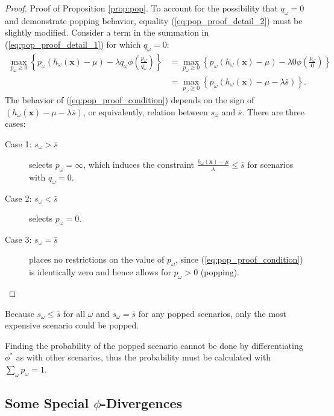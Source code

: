 \documentclass[opre,nonblindrev]{informs3} %
\newcommand{\x}{\mathbf{x}}
\begin{document}
\begin{proof}{\sc Proof of Proposition \ref{prop:pop}.}
	To account for the possibility that $q_\omega = 0$ and demonstrate popping behavior, equality (\ref{eq:pop_proof_detail_2}) must be slightly modified.
	Consider a term in the summation in (\ref{eq:pop_proof_detail_1}) for which $q_\omega = 0$:
	\begin{align}
		\max_{p_\omega \geq 0} \left\{ p_\omega (h_\omega(\x) - \mu) - \lambda q_\omega  \phi\left(\frac{p_\omega}{q_\omega}\right) \right\} & = \max_{p_\omega \geq 0} \left\{ p_\omega (h_\omega(\x) - \mu) - \lambda 0  \phi\left(\frac{p_\omega}{0}\right) \right\} \nonumber \\
		& = \max_{p_\omega \geq 0} \left\{ p_\omega \left( h_\omega(\x) - \mu - \lambda \bar{s} \right) \right\}. \label{eq:pop_proof_condition}
	\end{align}
	The behavior of (\ref{eq:pop_proof_condition}) depends on the sign of $\left( h_\omega(\x) - \mu - \lambda \bar{s}  \right)$, or equivalently, relation between $s_\omega$ and $\bar{s}$.
	There are three cases:
	\begin{description}
		\item[Case 1: $s_\omega > \bar{s}$] selects $p_\omega = \infty$, which induces the constraint $\frac{h_\omega(\x) - \mu}{\lambda} \leq \bar{s}$ for scenarios with $q_\omega = 0$.
		\item[Case 2: $s_\omega < \bar{s}$] selects $p_\omega = 0$.
		\item[Case 3: $s_\omega = \bar{s}$] places no restrictions on the value of $p_\omega$, since (\ref{eq:pop_proof_condition}) is identically zero and hence allows for $p_\omega > 0$ (popping). \Halmos
	\end{description}
\end{proof}

\begin{remark}
	Because $s_\omega \leq \bar{s}$ for all $\omega$ and $s_\omega = \bar{s}$ for any popped scenarios, only the most expensive scenario could be popped.
\end{remark}

\begin{remark}
	Finding the probability of the popped scenario cannot be done by differentiating $\phi^*$ as with other scenarios, thus the probability must be calculated with $\sum_\omega p_\omega = 1$.
\end{remark}

\subsection{Some Special $\phi$-Divergences}
\label{ssec:special_phi}
\end{document}
